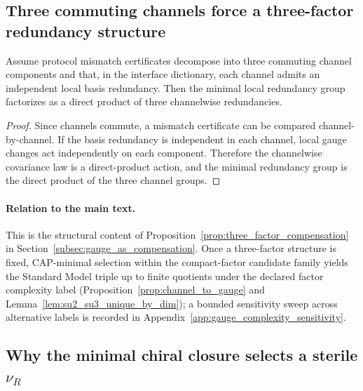 \subsection{Three commuting channels force a three-factor redundancy structure}
\label{subsec:forced_three_factor}

\begin{lemma}
\label{lem:three_channel_factorization}
Assume protocol mismatch certificates decompose into three commuting channel components and that, in the interface dictionary, each channel admits an independent local basis redundancy.
Then the minimal local redundancy group factorizes as a direct product of three channelwise redundancies.
\end{lemma}
\begin{proof}
Since channels commute, a mismatch certificate can be compared channel-by-channel.
If the basis redundancy is independent in each channel, local gauge changes act independently on each component.
Therefore the channelwise covariance law is a direct-product action, and the minimal redundancy group is the direct product of the three channel groups.
\end{proof}

\paragraph{Relation to the main text.}
This is the structural content of Proposition~\ref{prop:three_factor_compensation} in Section~\ref{subsec:gauge_as_compensation}.
Once a three-factor structure is fixed, CAP-minimal selection within the compact-factor candidate family yields the Standard Model triple up to finite quotients under the declared factor complexity label (Proposition~\ref{prop:channel_to_gauge} and Lemma~\ref{lem:su2_su3_unique_by_dim}); a bounded sensitivity sweep across alternative labels is recorded in Appendix~\ref{app:gauge_complexity_sensitivity}.

\subsection{Why the minimal chiral closure selects a sterile \texorpdfstring{$\nu_R$}{nuR}}
\label{subsec:forced_nur}

